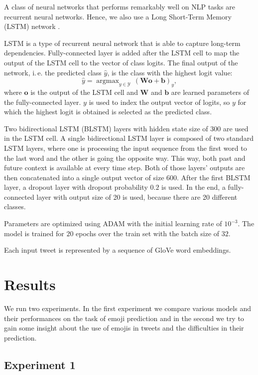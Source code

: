 \documentclass[10pt, a4paper]{article}
\DeclareMathOperator*{\argmax}{argmax}
\begin{document}
A class of neural networks that performs remarkably well on NLP tasks are 
recurrent neural networks. Hence, we also use a Long Short-Term Memory (LSTM) 
network \citep{hochreiter1997long}.

LSTM is a type of recurrent neural network that is able to capture long-term 
dependencies. Fully-connected layer is added after the LSTM cell to map the 
output of the LSTM cell to the vector of class logits. The final output of the 
network, i.\,e. the predicted class $\hat{y}$, is the class with the highest 
logit value:
$$\hat{y} = \argmax_{y \in \mathcal{Y}} 
    \,(\mathbf{W} \mathbf{o} + \mathbf{b})_y,$$
where $\mathbf{o}$ is the output of the LSTM cell and $\mathbf{W}$ and 
$\mathbf{b}$ are learned parameters of the fully-connected layer. $y$ is used to
index the output vector of logits, so $y$ for which the highest logit is 
obtained is selected as the predicted class.

Two bidirectional LSTM (BLSTM) layers with hidden state size of 300 are used in 
the LSTM cell. A single bidirectional LSTM layer is composed of two standard 
LSTM layers, where one is processing the input sequence from the first word to 
the last word and the other is going the opposite way. This way, both past and 
future context is available at every time step. Both of those layers' outputs 
are then concatenated into a single output vector of size 600. After the first 
BLSTM layer, a dropout layer with dropout probability $0.2$ is used. In the end,
a fully-connected layer with output size of 20 is used, because there are 20 
different classes.

Parameters are optimized using ADAM \citep{kingma2014adam} with the initial 
learning rate of $10^{-3}$. The model is trained for $20$ epochs over the train 
set with the batch size of $32$.

Each input tweet is represented by a sequence of GloVe word embeddings.

\section{Results}

We run two experiments. In the first experiment we compare various models and 
their performances on the task of emoji prediction and in the second we try to 
gain some insight about the use of emojis in tweets and the difficulties in 
their prediction.

\subsection{Experiment 1}
\end{document}
